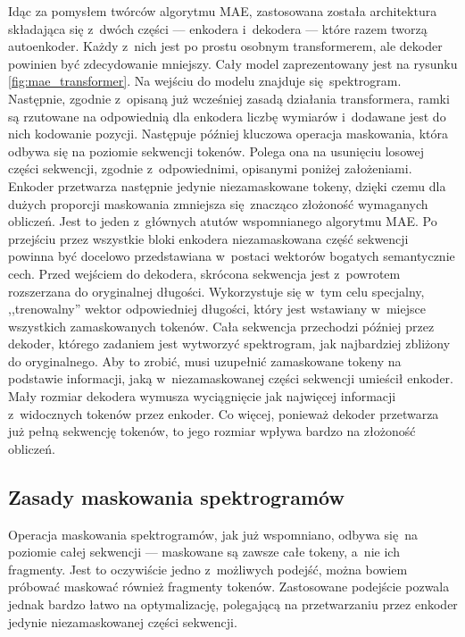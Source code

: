 Idąc za pomysłem twórców algorytmu MAE, zastosowana została architektura składająca się z~dwóch części --- enkodera i~dekodera --- które razem tworzą autoenkoder. Każdy z~nich jest po prostu osobnym transformerem, ale dekoder powinien być zdecydowanie mniejszy. Cały model zaprezentowany jest na rysunku \ref{fig:mae_transformer}. Na wejściu do modelu znajduje się spektrogram. Następnie, zgodnie z~opisaną już wcześniej zasadą działania transformera, ramki są rzutowane na odpowiednią dla enkodera liczbę wymiarów i~dodawane jest do nich kodowanie pozycji. Następuje później kluczowa operacja maskowania, która odbywa się na poziomie sekwencji tokenów. Polega ona na usunięciu losowej części sekwencji, zgodnie z~odpowiednimi, opisanymi poniżej założeniami. Enkoder przetwarza następnie jedynie niezamaskowane tokeny, dzięki czemu dla dużych proporcji maskowania zmniejsza się znacząco złożoność wymaganych obliczeń. Jest to jeden z~głównych atutów wspomnianego algorytmu MAE. Po przejściu przez wszystkie bloki enkodera niezamaskowana część sekwencji powinna być docelowo przedstawiana w~postaci wektorów bogatych semantycznie cech. Przed wejściem do dekodera, skrócona sekwencja jest z~powrotem rozszerzana do oryginalnej długości. Wykorzystuje się w~tym celu specjalny, ,,trenowalny'' wektor odpowiedniej długości, który jest wstawiany w~miejsce wszystkich zamaskowanych tokenów. Cała sekwencja przechodzi później przez dekoder, którego zadaniem jest wytworzyć spektrogram, jak najbardziej zbliżony do oryginalnego. Aby to zrobić, musi uzupełnić zamaskowane tokeny na podstawie informacji, jaką w~niezamaskowanej części sekwencji umieścił enkoder. Mały rozmiar dekodera wymusza wyciągnięcie jak najwięcej informacji z~widocznych tokenów przez enkoder. Co więcej, ponieważ dekoder przetwarza już pełną sekwencję tokenów, to jego rozmiar wpływa bardzo na złożoność obliczeń.

\subsection{Zasady maskowania spektrogramów}

Operacja maskowania spektrogramów, jak już wspomniano, odbywa się na poziomie całej sekwencji --- maskowane są zawsze całe tokeny, a~nie ich fragmenty. Jest to oczywiście jedno z~możliwych podejść, można bowiem próbować maskować również fragmenty tokenów. Zastosowane podejście pozwala jednak bardzo łatwo na optymalizację, polegającą na przetwarzaniu przez enkoder jedynie niezamaskowanej części sekwencji.

